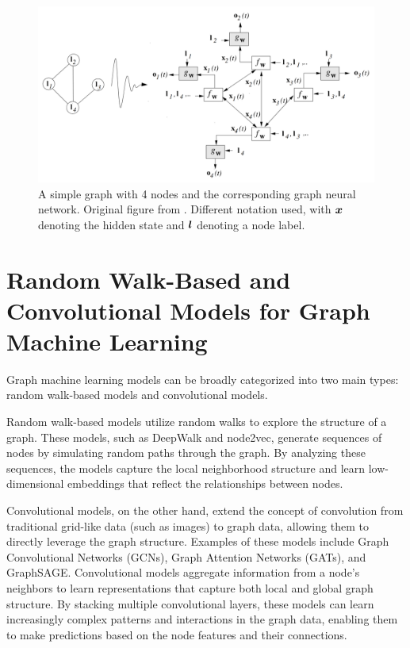 \begin{figure}
	\includegraphics[width=\linewidth]{images/GNN-gori.png}
	\caption{A simple graph with 4 nodes and the corresponding graph neural network. Original figure from \cite{gori_new_2005}. Different notation used, with \( \bm{x} \) denoting the hidden state and \( \bm{l} \) denoting a node label.}
	\label{fig:gori}
\end{figure}

\section{Random Walk-Based and Convolutional Models for Graph Machine Learning}

Graph machine learning models can be broadly categorized into two main types: random walk-based models and convolutional models.

Random walk-based models utilize random walks to explore the structure of a graph. These models, such as DeepWalk and node2vec, generate sequences of nodes by simulating random paths through the graph. By analyzing these sequences, the models capture the local neighborhood structure and learn low-dimensional embeddings that reflect the relationships between nodes.

Convolutional models, on the other hand, extend the concept of convolution from traditional grid-like data (such as images) to graph data, allowing them to directly leverage the graph structure. Examples of these models include Graph Convolutional Networks (GCNs), Graph Attention Networks (GATs), and GraphSAGE\@. Convolutional models aggregate information from a node’s neighbors to learn representations that capture both local and global graph structure. By stacking multiple convolutional layers, these models can learn increasingly complex patterns and interactions in the graph data, enabling them to make predictions based on the node features and their connections.

